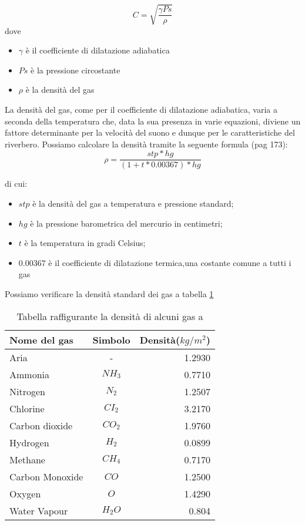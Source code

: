 \begin{equation}
C=\sqrt{\frac{\gamma Ps}{\rho}}
\end{equation}
dove

\begin{itemize}
      \item $\gamma$ è il coefficiente di dilatazione adiabatica
      \item $Ps$ è la pressione circostante
      \item $\rho$ è la densità del gas
\end{itemize}

La densità del gas, come per il coefficiente di dilatazione adiabatica, varia a
seconda della temperatura che, data la sua presenza in varie equazioni, diviene
un fattore determinante per la velocità del suono e dunque per le
caratteristiche del riverbero.
Possiamo calcolare la densità tramite la seguente formula (pag 173):
\begin{equation}
\rho = \frac{stp*hg}{(1+t*0.00367)*hg}
\end{equation}

di cui:

\begin{itemize}
      \item $stp$ è la densità del gas a temperatura e pressione standard;
      \item $hg$ è la pressione barometrica del mercurio in centimetri;
      \item $t$ è la temperatura in gradi Celsius;
      \item $0.00367$ è il  coefficiente di dilatazione termica,una costante comune a tutti i gas
\end{itemize}

Possiamo verificare la densità standard dei gas a tabella \ref{tab:dens}

\bigskip
\begin{table}[h]
\centering
\caption{Tabella raffigurante la densità di alcuni gas a \emph{}}
\label{tab:dens}
\begin{tabular}{lcr}
\toprule
Nome del gas & Simbolo & Densità($kg/m^2$) \\
\midrule
Aria & - & 1.2930 \\
Ammonia & $NH_3$ & 0.7710 \\
Nitrogen & $N_2$ & 1.2507 \\
Chlorine & $CI_2$ & 3.2170 \\
Carbon dioxide & $CO_2$ & 1.9760 \\
Hydrogen & $H_2$ & 0.0899 \\
Methane & $CH_4$ & 0.7170 \\
Carbon Monoxide & $CO$ & 1.2500 \\
Oxygen & $O$ &1.4290 \\
Water Vapour & $H_2O$ & 0.804 \\
\bottomrule
\end{tabular}
\end{table}
\smallskip

